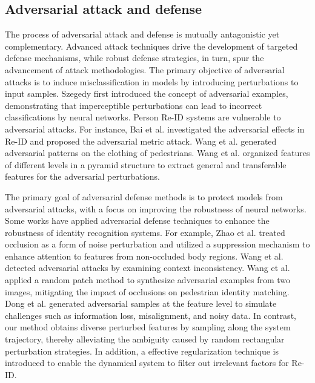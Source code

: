 \documentclass[12pt]{spieman}  %
\begin{document}
\begin{spacing}{2}
		\subsection{Adversarial attack and defense}
		The process of adversarial attack and defense is mutually antagonistic yet complementary. Advanced attack techniques drive the development of targeted defense mechanisms, while robust defense strategies, in turn, spur the advancement of attack methodologies. The primary objective of adversarial attacks is to induce misclassification in models by introducing perturbations to input samples. Szegedy \cite{szegedy2013intriguing} first introduced the concept of adversarial examples, demonstrating that imperceptible perturbations can lead to incorrect classifications by neural networks. Person Re-ID systems are vulnerable to adversarial attacks. For instance, Bai et al. \cite{bai2020adversarial} investigated the adversarial effects in Re-ID and proposed the adversarial metric attack. Wang et al. \cite{wang2019advpattern} generated adversarial patterns on the clothing of pedestrians. Wang et al. \cite{wang2020transferable} organized features of different levels in a pyramid structure to extract general and transferable features for the adversarial perturbations.
		
		The primary goal of adversarial defense methods is to protect models from adversarial attacks, with a focus on improving the robustness of neural networks. Some works have applied adversarial defense techniques to enhance the robustness of identity recognition systems. For example, Zhao et al. \cite{zhao2021incremental} treated occlusion as a form of noise perturbation and utilized a suppression mechanism to enhance attention to features from non-occluded body regions. Wang et al. \cite{wang2021multi} detected adversarial attacks by examining context inconsistency. Wang et al. \cite{wang2022occluded} applied a random patch method to synthesize adversarial examples from two images, mitigating the impact of occlusions on pedestrian identity matching. Dong et al. \cite{dong2023erasing} generated adversarial samples at the feature level to simulate challenges such as information loss, misalignment, and noisy data. In contrast, our method obtains diverse perturbed features by sampling along the system trajectory, thereby alleviating the ambiguity caused by random rectangular perturbation strategies. In addition, a effective regularization technique is introduced to enable the dynamical system to filter out irrelevant factors for Re-ID.
		

\end{spacing}
\end{document}
